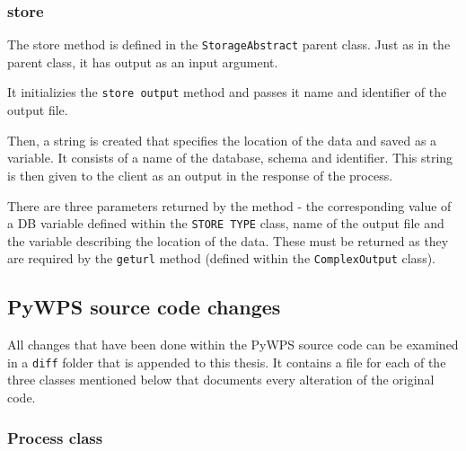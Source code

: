 \subsubsection{store} 

The store method is defined in the \texttt{StorageAbstract} parent
class. Just as in the parent class, it has output as an input
argument.

It initializies the \texttt{\textunderscore store\textunderscore
  output} method and passes it name and identifier of the output file.

Then, a string is created that specifies the location of the data and
saved as a variable. It consists of a name of the database, schema and
identifier. This string is then given to the client as an output in
the  response of the process.

There are three parameters returned by the method - the corresponding
value of a DB variable defined within the \texttt{STORE\textunderscore
  TYPE} class, name of the output file and the variable describing the
location of the data. These must be returned as they are required by
the \texttt{get\textunderscore url} method (defined within the
\texttt{ComplexOutput} class).


\subsection{PyWPS source code changes} 

All changes that have been done within the PyWPS source code can be
examined in a \texttt{diff} folder that is appended to this thesis. It
contains a file for each of the three classes mentioned below that
documents every alteration of the original code.

\subsubsection{Process class} 

